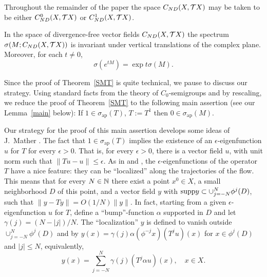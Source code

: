 Throughout the remainder of the paper the space ${C_{ND}(X,{{\cal{T}}X})}$ may be
taken to be either
$C_{ND}^0(X,{{\cal{T}}X})$ or
$C_{ND}^1(X,{{\cal{T}}X})$.








\begin{thm}\label{SMT}
In the space of divergence-free
vector fields
$C_{ND}(X,{{\cal{T}}X})$ the spectrum $\sigma (M;{C_{ND}(X,{{\cal{T}}X})})$
is invariant under vertical translations of
the complex plane. Moreover, for each $t\ne 0$,
\begin{equation}\label{exp}
\sigma (e^{tM}) = \exp t \sigma (M).
\end{equation}
\end{thm}

Since the proof of Theorem~\ref{SMT}
is quite technical, we pause to
discuss our strategy.
Using  standard facts from the
theory of $C_0$-semigroups and by rescaling, we reduce
the proof of Theorem~\ref{SMT} to the following main assertion
(see our  Lemma~\ref{main} below):
If $1\in\sigma_{\mbox{ap}}(T)$, $T:=T^1$ then
$0\in\sigma_{\mbox{ap}}(M)$.

Our strategy for the
proof of this main assertion develops some ideas
of J.~Mather \cite{Mather}. The fact that
$1\in\sigma_{\mbox{ap}}(T)$ implies  the existence of an
$\epsilon$-eigenfunction $u$ for $T$ for every $\epsilon>0$.
That is,
for every $\epsilon>0$,  there is a vector field $u$,
with unit norm
such that $\|Tu-u\|\le\epsilon$.
As in  \cite{Mather} and \cite{Rafael}, the
$\epsilon$-eigenfunctions of the operator
$T$ have a nice feature: they can be ``localized'' along the
trajectories of the flow. This means that for every $N\in{\Bbb{N}}$
there exist  a point $x^0\in X$, a
small neighborhood $D$ of this point, and a vector field $y$
with $\hbox{\rm supp} y\subset \cup_{j=-N}^N \phi^j(D)$, such that
$\|y-Ty\|=O(1/N)\|y\|$. In fact,
starting from a given
$\epsilon$-eigenfunction $u$ for $T$,
define a
``bump''-function $\alpha$ supported in $D$ and
let $\gamma(j)=(N-|j|)/N$.
The ``localization'' $y$ is
defined to vanish outside $\cup_{j=-N}^N \phi^j(D)$ and by
$y(x)=\gamma (j) \alpha(\phi^{-j}x)(T^ju)(x)$ for
$x\in \phi^j(D)$ and $|j|\leq N$,
equivalently,
\[
y(x)=\sum_{j=-N}^N \gamma (j)(T^j\alpha u)(x),\quad x\in X.
\]

